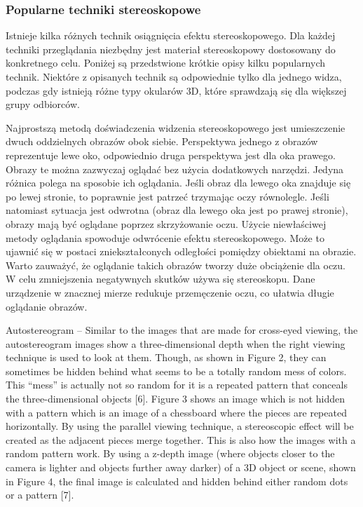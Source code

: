 \subsubsection{Popularne techniki stereoskopowe}
Istnieje kilka różnych technik osiągnięcia efektu stereoskopowego. Dla każdej techniki przeglądania niezbędny jest materiał stereoskopowy dostosowany do konkretnego celu. Poniżej są przedstwione krótkie opisy kilku popularnych technik. Niektóre z opisanych technik są odpowiednie tylko dla jednego widza, podczas gdy istnieją różne typy okularów 3D, które sprawdzają się dla większej grupy odbiorców.
\begin{itemize}
\itemi Najprostszą metodą doświadczenia widzenia stereoskopowego jest umieszczenie dwuch oddzielnych obrazów obok siebie. Perspektywa jednego z obrazów reprezentuje lewe oko, odpowiednio druga perspektywa jest dla oka prawego. Obrazy te można zazwyczaj oglądać bez użycia dodatkowych narzędzi. Jedyna różnica polega na sposobie ich oglądania. Jeśli obraz dla lewego oka znajduje się po lewej stronie, to poprawnie jest patrzeć trzymając oczy równolegle. Jeśli natomiast sytuacja jest odwrotna (obraz dla lewego oka jest po prawej stronie), obrazy mają być oglądane poprzez skrzyżowanie oczu. Użycie niewłaściwej metody oglądania spowoduje odwrócenie efektu stereoskopowego. Może to ujawnić się w postaci zniekształconych odległości pomiędzy obiektami na obrazie.\\
Warto zauważyć, że oglądanie takich obrazów tworzy duże obciążenie dla oczu. W celu zmniejszenia negatywnych skutków używa się stereoskopu. Dane urządzenie w znacznej mierze redukuje przemęczenie oczu, co ułatwia długie oglądanie obrazów.

\itemi Autostereogram – Similar to the images that are made for cross-eyed viewing,
the autostereogram images show a three-dimensional depth when the right
viewing technique is used to look at them. Though, as shown in Figure 2, they
can sometimes be hidden behind what seems to be a totally random mess of
colors. This “mess” is actually not so random for it is a repeated pattern that
conceals the three-dimensional objects [6]. Figure 3 shows an image which is
not hidden with a pattern which is an image of a chessboard where the pieces
are repeated horizontally. By using the parallel viewing technique, a
stereoscopic effect will be created as the adjacent pieces merge together. This
is also how the images with a random pattern work. By using a z-depth image
(where objects closer to the camera is lighter and objects further away darker)
of a 3D object or scene, shown in Figure 4, the final image is calculated and
hidden behind either random dots or a pattern [7].


\end{itemize}
